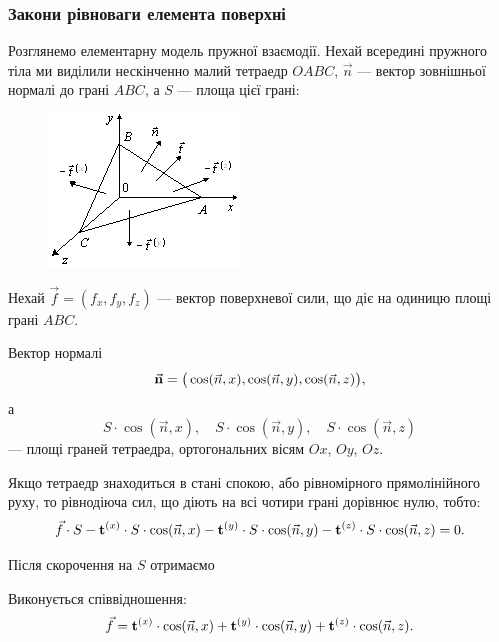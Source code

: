 \subsubsection{Закони рівноваги елемента поверхні}

Розглянемо елементарну модель пружної взаємодії. Нехай всередині пружного тіла ми виділили нескінченно малий тетраедр $OABC$, $\vec n$ --- вектор зовнішньої нормалі до грані $ABC$, а $S$ --- площа цієї грані:
\begin{figure}[H]
	\centering
	\includegraphics[]{img/8-2.png}
\end{figure}

Нехай $\vec f = (f_x, f_y, f_z)$ --- вектор поверхневої сили, що діє на одиницю площі грані $ABC$. \medskip

Вектор нормалі
\begin{equation}
	\vec{\bf{n}} = \big( \cos( \vec n, x ), \cos ( \vec n, y ), \cos ( \vec n, z ) \big),
\end{equation}
а
\begin{equation}
	S \cdot \cos (\vec n, x ), \quad S \cdot \cos (\vec n, y ), \quad S \cdot \cos (\vec n, z) 	
\end{equation} 
--- площі граней тетраедра, ортогональних вісям $Ox$, $Oy$, $Oz$. \medskip

Якщо тетраедр знаходиться в стані спокою, або рівномірного прямолінійного руху, то рівнодіюча сил, що діють на всі чотири грані дорівнює нулю, тобто: 
\begin{equation}
	\vec f \cdot S - \bf{t}^{(x)} \cdot S \cdot \cos ( \vec n, x) - \bf{t}^{(y)} \cdot S \cdot \cos ( \vec n, y) - \bf{t}^{(z)} \cdot S \cdot \cos ( \vec n, z) = 0.
\end{equation}

Після скорочення на $S$ отримаємо
\begin{theorem}
	Виконується співвідношення:
	\begin{equation}
		\vec f = \bf{t}^{(x)} \cdot \cos ( \vec n, x) + \bf{t}^{(y)} \cdot \cos ( \vec n, y) + \bf{t}^{(z)} \cdot \cos ( \vec n, z).
	\end{equation}
\end{theorem}

